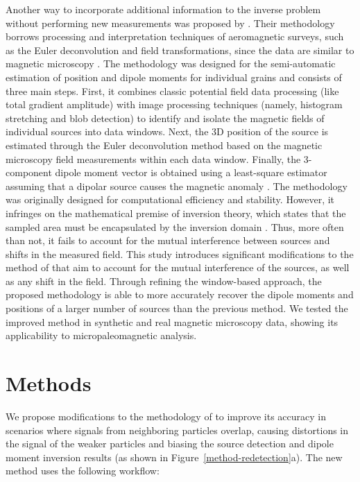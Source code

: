 Another way to incorporate additional information to the inverse problem without performing new measurements was proposed by \citet{Souza-Junior2024}. Their methodology borrows processing and interpretation techniques of aeromagnetic surveys, such as the Euler deconvolution and field transformations, since the data are similar to magnetic microscopy \citep{Weiss2007}. The methodology was designed for the semi-automatic estimation of position and dipole moments for individual grains and consists of three main steps. First, it combines classic potential field data processing (like total gradient amplitude) with image processing techniques (namely, histogram stretching and blob detection) to identify and isolate the magnetic fields of individual sources into data windows. Next, the 3D position of the source is estimated through the Euler deconvolution method \citep{Reid1990} based on the magnetic microscopy field measurements within each data window. Finally, the 3-component dipole moment vector is obtained using a least-square estimator assuming that a dipolar source causes the magnetic anomaly \citep{Oliveira2015Estimation}. The methodology was originally designed for computational efficiency and stability. However, it infringes on the mathematical premise of inversion theory, which states that the sampled area must be encapsulated by the inversion domain \citep{Baratchart2013, Lima2013}. Thus, more often than not, it fails to account for the mutual interference between sources and shifts in the measured field. This study introduces significant modifications to the method of \citet{Souza-Junior2024} that aim to account for the mutual interference of the sources, as well as any shift in the field. Through refining the window-based approach, the proposed methodology is able to more accurately recover the dipole moments and positions of a larger number of sources than the previous method. We tested the improved method in synthetic and real magnetic microscopy data, showing its applicability to micropaleomagnetic analysis.


\section{Methods}

We propose modifications to the methodology of \citet{Souza-Junior2024} to improve its accuracy in scenarios where signals from neighboring particles overlap, causing distortions in the signal of the weaker particles and biasing the source detection and dipole moment inversion results (as shown in Figure~\ref{method-redetection}a). The new method uses the following workflow:

